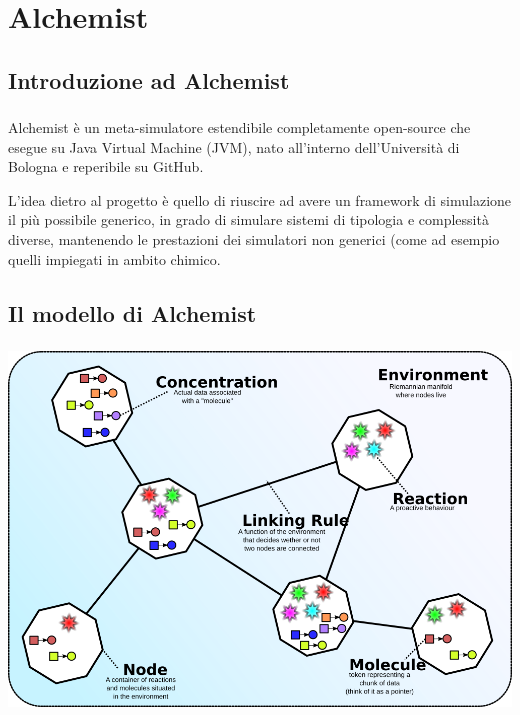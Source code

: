 \documentclass[%
]{beamer}
\begin{document}
    \section{Alchemist}\label{sec:alchemist}

    \subsection{Introduzione ad Alchemist}\label{subsec:alchIntro}
    \begin{frame}
        \frametitle{\insertsection}
        \framesubtitle{\insertsubsection}

        Alchemist
         è un meta-simulatore estendibile completamente open-source che esegue su Java Virtual Machine (JVM), nato all’interno dell’Università di Bologna e reperibile su GitHub.

        \medskip
        \pause

        L'idea dietro al progetto è quello di riuscire ad avere un framework di simulazione il più possibile generico, in grado di simulare sistemi di tipologia e complessità diverse, mantenendo le prestazioni dei simulatori non generici (come ad esempio quelli impiegati in ambito chimico.%
    \end{frame}

    \subsection{Il modello di Alchemist}\label{subsec:alchModel}
    \begin{frame}
        \frametitle{\insertsection}
        \framesubtitle{\insertsubsection}

        \centering
        \includegraphics[scale=.34]{fig/alchemist_model}
    \end{frame}
\end{document}
